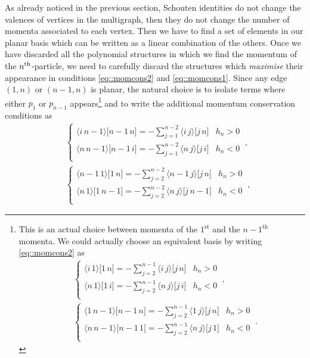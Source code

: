 \documentclass[aps,prd,nofootinbib,twocolumn,10pt]{revtex4-2}
\newcommand{\agl}[2]{\langle#1\, #2 \rangle}
\newcommand{\sqr}[2]{\lbrack #1\, #2 \rbrack}
\begin{document}
As already noticed in the previous section, Schouten identities do not change the valences of vertices in the multigraph, then they do not change the number of momenta associated to each vertex. Then we have to find a set of elements in our planar basis which can be written as a linear combination of the others. Once we have discarded all the polynomial structures in which we find the momentum of the $n^{\rm th}$-particle, we need to carefully discard the structures which \textit{maximise} their appearance in conditions \eqref{eq::momcons2} and \eqref{eq::momcons1}. Since any edge $(1,n)$ or $(n-1,n)$ is planar, the natural choice is to isolate terms where either $p_1$ or $p_{n-1}$ appears\footnote{This is an actual choice between momenta of the $1^{\mathrm{st}}$ and the $n-1^{\mathrm{th}}$ momenta. We could actually choose an equivalent basis by writing \eqref{eq::momcons2} as
\begin{align*}
	&\begin{cases}
		\agl{i}{1} \sqr{1}{n} = - \sum\limits_{j=2}^{n-1} \agl{i}{j} \sqr{j}{n} &  h_n>0\\[1em]
        \agl{n}{1} \sqr{1}{i} = - \sum\limits_{j=2}^{n-1} \agl{n}{j} \sqr{j}{i} &  h_n<0\\
	\end{cases}\ ,\\
	&\begin{cases}
		\agl{1}{n-1} \sqr{n-1}{n} = - \sum\limits_{j=2}^{n-1} \agl{1}{j} \sqr{j}{n} &  h_n>0\\[1em]
        \agl{n}{n-1} \sqr{n-1}{1} = - \sum\limits_{j=2}^{n-1} \agl{n}{j} \sqr{j}{1} &  h_n<0\\
	\end{cases}\ .
\end{align*}
} 
and to write the additional momentum conservation conditions as
\begin{align}
	\label{eq:momconsCond1}
	&\begin{cases}
		\agl{i}{n-1} \sqr{n-1}{n} = - \sum\limits_{j=1}^{n-2} \agl{i}{j} \sqr{j}{n} &  h_n>0\\[1em]
        \agl{n}{n-1} \sqr{n-1}{i} = - \sum\limits_{j=1}^{n-2} \agl{n}{j} \sqr{j}{i} &  h_n<0\\
	\end{cases}\ ,\\
	&\begin{cases}
		\agl{n-1}{1} \sqr{1}{n} = - \sum\limits_{j=2}^{n-2} \agl{n-1}{j} \sqr{j}{n} &  h_n>0\\[1em]
        \agl{n}{1} \sqr{1}{n-1} = - \sum\limits_{j=2}^{n-2} \agl{n}{j} \sqr{j}{n-1} &  h_n<0\\
	\end{cases}\ ,
\end{align}
\end{document}
